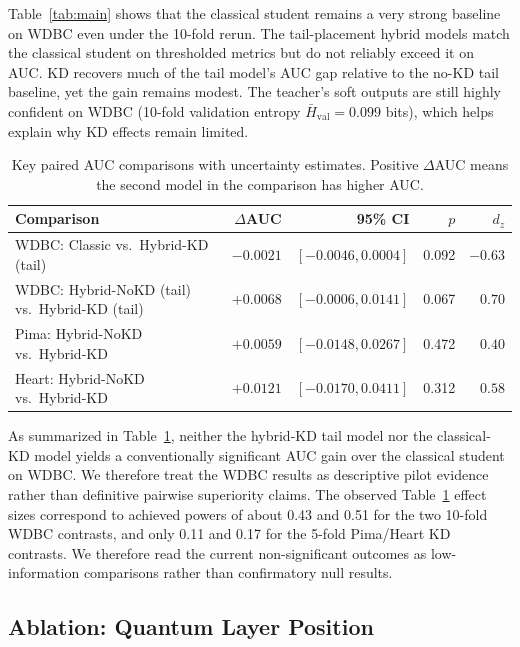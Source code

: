 \documentclass[11pt,a4paper]{article}
\begin{document}
Table~\ref{tab:main} shows that the classical student remains a very strong baseline on WDBC even
under the 10-fold rerun. The tail-placement hybrid models match the classical student on thresholded
metrics but do not reliably exceed it on AUC. KD recovers much of the tail model's AUC gap relative
to the no-KD tail baseline, yet the gain remains modest. The teacher's soft outputs are still highly
confident on WDBC (10-fold validation entropy $\bar{H}_{\text{val}} = 0.099$ bits), which helps
explain why KD effects remain limited.

\begin{table}[t]
\caption{Key paired AUC comparisons with uncertainty estimates. Positive $\Delta$AUC means the second
model in the comparison has higher AUC.}
\label{tab:stats}
\centering\small
\begin{tabular}{lrrrr}
\toprule
Comparison & $\Delta$AUC & 95\% CI & $p$ & $d_z$ \\
\midrule
WDBC: Classic vs.\ Hybrid-KD (tail) & $-0.0021$ & $[-0.0046, 0.0004]$ & 0.092 & $-0.63$ \\
WDBC: Hybrid-NoKD (tail) vs.\ Hybrid-KD (tail) & $+0.0068$ & $[-0.0006, 0.0141]$ & 0.067 & $0.70$ \\
Pima: Hybrid-NoKD vs.\ Hybrid-KD & $+0.0059$ & $[-0.0148, 0.0267]$ & 0.472 & $0.40$ \\
Heart: Hybrid-NoKD vs.\ Hybrid-KD & $+0.0121$ & $[-0.0170, 0.0411]$ & 0.312 & $0.58$ \\
\bottomrule
\end{tabular}
\end{table}

As summarized in Table~\ref{tab:stats}, neither the hybrid-KD tail model nor the classical-KD model
yields a conventionally significant AUC gain over the classical student on WDBC. We therefore treat
the WDBC results as descriptive pilot evidence rather than definitive pairwise superiority claims.
The observed Table~\ref{tab:stats} effect sizes correspond to achieved powers of about 0.43 and 0.51
for the two 10-fold WDBC contrasts, and only 0.11 and 0.17 for the 5-fold Pima/Heart KD contrasts.
We therefore read the current non-significant outcomes as low-information comparisons rather than
confirmatory null results.

\subsection{Ablation: Quantum Layer Position}
\end{document}
